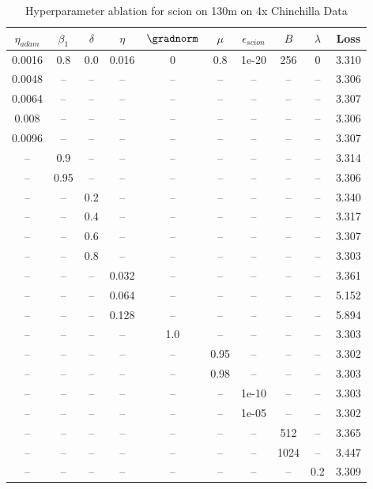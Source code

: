\begin{table}[h!]
\centering
\caption{Hyperparameter ablation for scion on 130m on 4x Chinchilla Data}
\label{tab:ablation_scion_130m_on_4x_chinchilla_data}
\begin{tabular}{cccccccccc}
\toprule
$\eta_{adam}$ & $\beta_1$ & $\delta$ & $\eta$ & $\gradnorm$ & $\mu$ & $\epsilon_{scion}$ & $B$ & $\lambda$ & Loss \\
\midrule
0.0016 & 0.8 & 0.0 & 0.016 & 0 & 0.8 & 1e-20 & 256 & 0 & 3.310 \\
\midrule
0.0048 & -- & -- & -- & -- & -- & -- & -- & -- & 3.306 \\
0.0064 & -- & -- & -- & -- & -- & -- & -- & -- & 3.307 \\
0.008 & -- & -- & -- & -- & -- & -- & -- & -- & 3.306 \\
0.0096 & -- & -- & -- & -- & -- & -- & -- & -- & 3.307 \\
-- & 0.9 & -- & -- & -- & -- & -- & -- & -- & 3.314 \\
-- & 0.95 & -- & -- & -- & -- & -- & -- & -- & 3.306 \\
-- & -- & 0.2 & -- & -- & -- & -- & -- & -- & 3.340 \\
-- & -- & 0.4 & -- & -- & -- & -- & -- & -- & 3.317 \\
-- & -- & 0.6 & -- & -- & -- & -- & -- & -- & 3.307 \\
-- & -- & 0.8 & -- & -- & -- & -- & -- & -- & 3.303 \\
-- & -- & -- & 0.032 & -- & -- & -- & -- & -- & 3.361 \\
-- & -- & -- & 0.064 & -- & -- & -- & -- & -- & 5.152 \\
-- & -- & -- & 0.128 & -- & -- & -- & -- & -- & 5.894 \\
-- & -- & -- & -- & 1.0 & -- & -- & -- & -- & 3.303 \\
-- & -- & -- & -- & -- & 0.95 & -- & -- & -- & 3.302 \\
-- & -- & -- & -- & -- & 0.98 & -- & -- & -- & 3.303 \\
-- & -- & -- & -- & -- & -- & 1e-10 & -- & -- & 3.303 \\
-- & -- & -- & -- & -- & -- & 1e-05 & -- & -- & 3.302 \\
-- & -- & -- & -- & -- & -- & -- & 512 & -- & 3.365 \\
-- & -- & -- & -- & -- & -- & -- & 1024 & -- & 3.447 \\
-- & -- & -- & -- & -- & -- & -- & -- & 0.2 & 3.309 \\
\bottomrule
\end{tabular}
\end{table}

